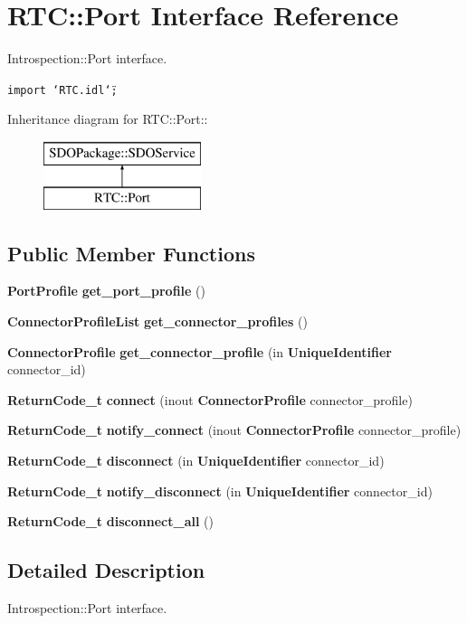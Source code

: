 \section{RTC::Port Interface Reference}
\label{interfaceRTC_1_1Port}
Introspection::Port interface.  


{\tt import \char`\"{}RTC.idl\char`\"{};}

Inheritance diagram for RTC::Port::\begin{figure}[H]
\begin{center}
\leavevmode
\includegraphics[height=2cm]{interfaceRTC_1_1Port}
\end{center}
\end{figure}
\subsection*{Public Member Functions}
\begin{CompactItemize}
\item 
{\bf Port\-Profile} {\bf get\_\-port\_\-profile} ()
\item 
{\bf Connector\-Profile\-List} {\bf get\_\-connector\_\-profiles} ()
\item 
{\bf Connector\-Profile} {\bf get\_\-connector\_\-profile} (in {\bf Unique\-Identifier} connector\_\-id)
\item 
{\bf Return\-Code\_\-t} {\bf connect} (inout {\bf Connector\-Profile} connector\_\-profile)
\item 
{\bf Return\-Code\_\-t} {\bf notify\_\-connect} (inout {\bf Connector\-Profile} connector\_\-profile)
\item 
{\bf Return\-Code\_\-t} {\bf disconnect} (in {\bf Unique\-Identifier} connector\_\-id)
\item 
{\bf Return\-Code\_\-t} {\bf notify\_\-disconnect} (in {\bf Unique\-Identifier} connector\_\-id)
\item 
{\bf Return\-Code\_\-t} {\bf disconnect\_\-all} ()
\end{CompactItemize}


\subsection{Detailed Description}
Introspection::Port interface. 



